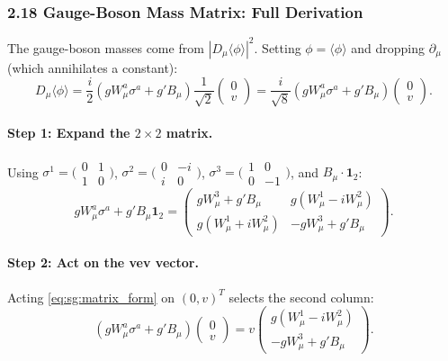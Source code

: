 \documentclass[12pt,a4paper]{article}
\begin{document}
\subsubsection*{2.18 \quad Gauge-Boson Mass Matrix: Full Derivation}

The gauge-boson masses come from $|D_\mu\langle\phi\rangle|^2$. Setting $\phi = \langle\phi\rangle$ and dropping $\partial_\mu$ (which annihilates a constant):
\begin{equation}
  D_\mu\langle\phi\rangle
  = \frac{i}{2}\left(gW^a_\mu\sigma^a + g'B_\mu\right)\frac{1}{\sqrt{2}}\begin{pmatrix}0\\v\end{pmatrix}
  = \frac{i}{\sqrt{8}}\left(gW^a_\mu\sigma^a + g'B_\mu\right)\begin{pmatrix}0\\v\end{pmatrix} .
  \label{eq:sg:Dvev}
\end{equation}

\paragraph{Step 1: Expand the $2\times 2$ matrix.}
Using $\sigma^1 = \bigl(\begin{smallmatrix}0&1\\1&0\end{smallmatrix}\bigr)$, $\sigma^2 = \bigl(\begin{smallmatrix}0&-i\\i&0\end{smallmatrix}\bigr)$, $\sigma^3 = \bigl(\begin{smallmatrix}1&0\\0&-1\end{smallmatrix}\bigr)$, and $B_\mu\cdot\mathbf{1}_2$:
\begin{equation}
  gW^a_\mu\sigma^a + g'B_\mu\mathbf{1}_2
  = \begin{pmatrix}
      gW^3_\mu + g'B_\mu & g(W^1_\mu - iW^2_\mu) \\[4pt]
      g(W^1_\mu + iW^2_\mu) & -gW^3_\mu + g'B_\mu
    \end{pmatrix} .
  \label{eq:sg:matrix_form}
\end{equation}

\paragraph{Step 2: Act on the vev vector.}
Acting \eqref{eq:sg:matrix_form} on $(0,v)^T$ selects the second column:
\begin{equation}
  \left(gW^a_\mu\sigma^a + g'B_\mu\right)\begin{pmatrix}0\\v\end{pmatrix}
  = v\begin{pmatrix}g(W^1_\mu - iW^2_\mu)\\[4pt]-gW^3_\mu + g'B_\mu\end{pmatrix} .
  \label{eq:sg:matrix_on_vev}
\end{equation}
\end{document}
